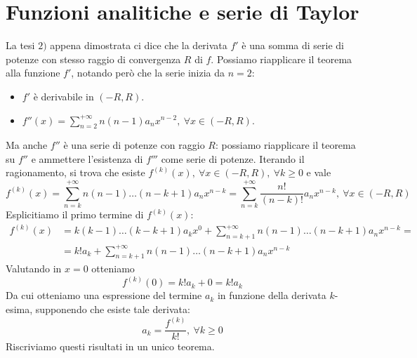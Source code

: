 \section{Funzioni analitiche e serie di Taylor}
La tesi $2)$ appena dimostrata ci dice che la derivata $f'$ è una somma di serie di potenze con stesso raggio di convergenza $R$ di $f$. Possiamo riapplicare il teorema alla funzione $f'$, notando però che la serie inizia da $n=2$:
\begin{itemize}
	\item $f'$ è derivabile in $\left(-R,R\right)$.
	\item $\displaystyle f''\left(x\right)=\sum_{n=2}^{+\infty}n\left(n-1\right)a_nx^{n-2},\ \forall x\in\left(-R,R\right)$.
\end{itemize}
Ma anche $f''$ è una serie di potenze con raggio $R$: possiamo riapplicare il teorema su $f''$ e ammettere l'esistenza di $f'''$ come serie di potenze. Iterando il ragionamento, si trova che esiste $f^{\left(k\right)}\left(x\right),\ \forall x\in\left(-R,R\right),\ \forall k\geq 0$ e vale
\begin{equation}
	f^{\left(k\right)}\left(x\right)=\sum_{n=k}^{+\infty}n\left(n-1\right)\ldots\left(n-k+1\right)a_nx^{n-k}=\sum_{n=k}^{+\infty}\frac{n!}{\left(n-k\right)!}a_nx^{n-k},\ \forall x\in\left(-R,R\right)
\end{equation}
Esplicitiamo il primo termine di $f^{\left(k\right)}\left(x\right)$:
\begin{align*}
	f^{\left(k\right)}\left(x\right)&=k\left(k-1\right)\ldots\left(k-k+1\right)a_kx^0+\sum_{n=k+1}^{+\infty}n\left(n-1\right)\ldots\left(n-k+1\right)a_nx^{n-k}=\\
	&=k!a_k+\sum_{n=k+1}^{+\infty}n\left(n-1\right)\ldots\left(n-k+1\right)a_nx^{n-k}
\end{align*}
Valutando in $x=0$ otteniamo
\begin{equation*}
	f^{\left(k\right)}\left(0\right)=k!a_k+0=k!a_k
\end{equation*}
Da cui otteniamo una espressione del termine $a_k$ in funzione della derivata $k$-esima, supponendo che esiste tale derivata:
\begin{equation}
	a_k=\frac{f^{\left(k\right)}}{k!},\ \forall k\geq 0
\end{equation}
Riscriviamo questi risultati in un unico teorema.

